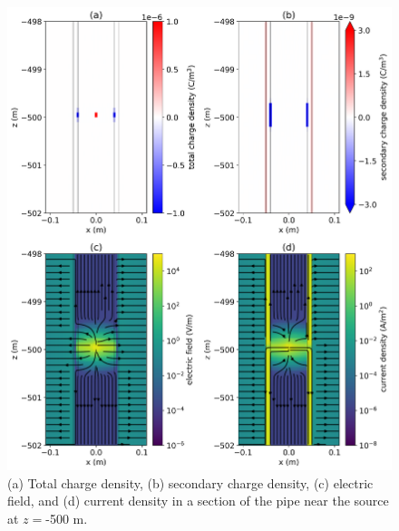\begin{figure}
    \begin{center}
    \includegraphics[width=0.8\columnwidth]{figures/casing_software/kaufman_zones.png}
    \end{center}
\caption{(a) Total charge density, (b) secondary charge density, (c) electric field, and (d) current density in a section of the pipe near the source at $z=$-500 m.}
\label{fig:kaufman_zones}
\end{figure}
